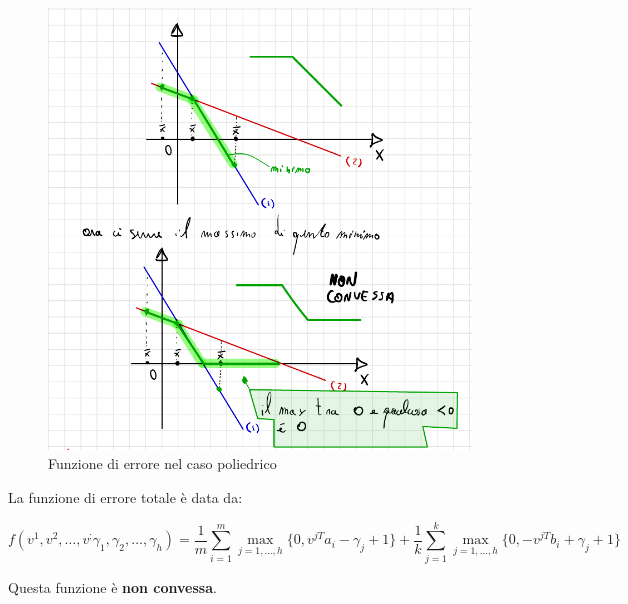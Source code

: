 \begin{definition}
    \begin{figure}[H]
        \centering
        \includegraphics[width=0.8\linewidth]{images/tosta.png}
        \caption{Funzione di errore nel caso poliedrico}
        \label{fig:3-1}
    \end{figure}
    
    La funzione di errore 
    totale è data da:

    $$
        f ( v^1, v^2, \dots, v^; \gamma_1, \gamma_2, \dots, \gamma_h ) = \frac{1}{m} \sum_{i=1}^{m} \max_{j=1, \dots, h} \{0, v^{jT} a_i - \gamma_j + 1\} + \frac{1}{k} \sum_{j=1}^{k} \max_{j=1, \dots, h} \{0, -v^{jT} b_i + \gamma_j + 1\}
    $$

    Questa funzione è \textbf{non convessa}.
\end{definition}

